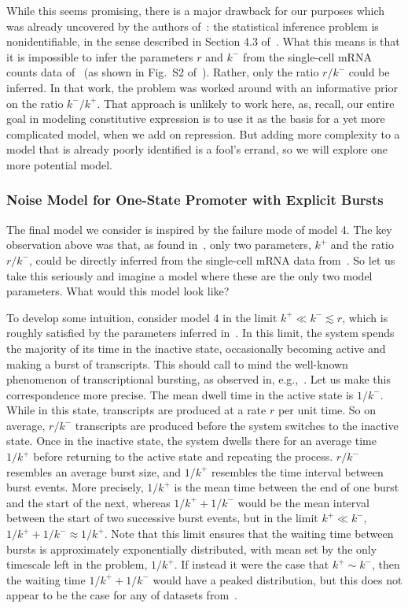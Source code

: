 While this seems promising, there is a major drawback for our purposes which was
already uncovered by the authors of~\cite{Razo-Mejia2020}: the statistical
inference problem is nonidentifiable, in the sense described in Section 4.3
of~\cite{Gelman2013}. What this means is that it is impossible to infer the
parameters $r$ and $k^-$ from the single-cell mRNA counts data
of~\cite{Jones2014} (as shown in Fig.~S2 of~\cite{Razo-Mejia2020}). Rather, only
the ratio $r/k^-$ could be inferred. In that work, the problem was worked around
with an informative prior on the ratio $k^-/k^+$. That approach is unlikely to
work here, as, recall, our entire goal in modeling constitutive expression is to
use it as the basis for a yet more complicated model, when we add on repression.
But adding more complexity to a model that is already poorly identified is a
fool's errand, so we will explore one more potential model.

\subsubsection{Noise Model for One-State Promoter with Explicit Bursts}

The final model we consider is inspired by the failure mode of model 4. The key
observation above was that, as found in~\cite{Razo-Mejia2020}, only two
parameters, $k^+$ and the ratio $r/k^-$, could be directly inferred from the
single-cell mRNA data from~\cite{Jones2014}. So let us take this seriously and
imagine a model where these are the only two model parameters. What would this
model look like?

To develop some intuition, consider model 4 in the limit $k^+ \ll k^- \lesssim
r$, which is roughly satisfied by the parameters inferred
in~\cite{Razo-Mejia2020}. In this limit, the system spends the majority of its
time in the inactive state, occasionally becoming active and making a burst of
transcripts. This should call to mind the well-known phenomenon of
transcriptional bursting, as observed in,
e.g.,~\cite{Golding2005,Chong2014,Senecal2014,Sevier2016,Sepulveda2016}. Let us
make this correspondence more precise. The mean dwell time in the active state
is $1/k^-$. While in this state, transcripts are produced at a rate $r$ per unit
time. So on average, $r/k^-$ transcripts are produced before the system switches
to the inactive state. Once in the inactive state, the system dwells there for
an average time $1/k^+$ before returning to the active state and repeating the
process. $r/k^-$ resembles an average burst size, and $1/k^+$ resembles the time
interval between burst events. More precisely, $1/k^+$ is the mean time between
the end of one burst and the start of the next, whereas $1/k^+ + 1/k^-$ would be
the mean interval between the start of two successive burst events, but in the
limit $k^+ \ll k^-$, $1/k^+ + 1/k^- \approx 1/k^+$. Note that this limit ensures
that the waiting time between bursts is approximately exponentially distributed,
with mean set by the only timescale left in the problem, $1/k^+$. If instead it
were the case that $k^+ \sim k^-$, then the waiting time $1/k^+ + 1/k^-$ would
have a peaked distribution, but this does not appear to be the case for any of
datasets from~\cite{Jones2014}.


